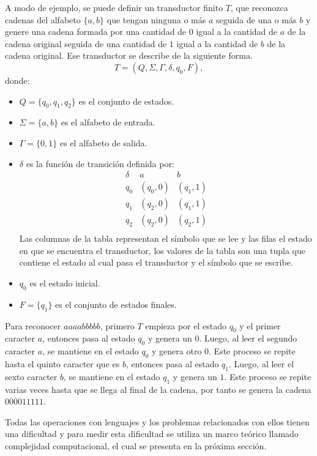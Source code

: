 A modo de ejemplo, se puede definir un transductor finito $T$, que reconozca cadenas del alfabeto $\{a,b\}$ que tengan ninguna o más $a$ seguida de una o más $b$ y genere una cadena formada por una cantidad de $0$ igual a la cantidad de $a$ de la cadena original seguida de una cantidad de $1$ igual a la cantidad de $b$ de la cadena original. Ese transductor se describe de la siguiente forma.
\[
  T = (Q, \Sigma, \Gamma, \delta, q_0, F),
\]
donde:
\begin{itemize}
  \item \(Q = \{q_0, q_1, q_2\}\) es el conjunto de estados.
  \item \(\Sigma = \{a, b\}\) es el alfabeto de entrada.
  \item \(\Gamma = \{0, 1\}\) es el alfabeto de salida.
  \item \(\delta\) es la función de transición definida por:
        \[
          \begin{array}{c|c|c}
            \delta & a        & b        \\
            \hline
            q_0    & (q_0, 0) & (q_1, 1) \\
            q_1    & (q_2, 0) & (q_1, 1) \\
            q_2    & (q_2, 0) & (q_2, 1) \\
          \end{array}
        \]
        Las columnas de la tabla representan el símbolo que se lee y las filas el estado en que se encuentra el transductor, 
        los valores de la tabla son una tupla que contiene el estado al cual pasa el transductor y el símbolo que se escribe.
  \item \(q_0\) es el estado inicial.
  \item \(F = \{q_1\}\) es el conjunto de estados finales.
\end{itemize}

Para reconocer $aaaabbbbb$, primero $T$ empieza por el estado $q_0$ y el primer caracter $a$, entonces pasa al estado $q_0$ y genera un $0$.
Luego, al leer el segundo caracter $a$, se mantiene en el estado $q_0$ y genera otro $0$. Este proceso se repite hasta el quinto caracter
que es $b$, entonces pasa al estado $q_1$. Luego, al leer el sexto caracter $b$, se mantiene en el estado $q_1$ y genera un $1$. Este proceso
se repite varias veces hasta que se llega al final de la cadena, por tanto se genera la cadena $000011111$.

Todas las operaciones con lenguajes y los problemas relacionados con ellos tienen una dificultad y para medir esta dificultad
se utiliza un marco teórico llamado complejidad computacional, el cual se presenta en la próxima sección.

